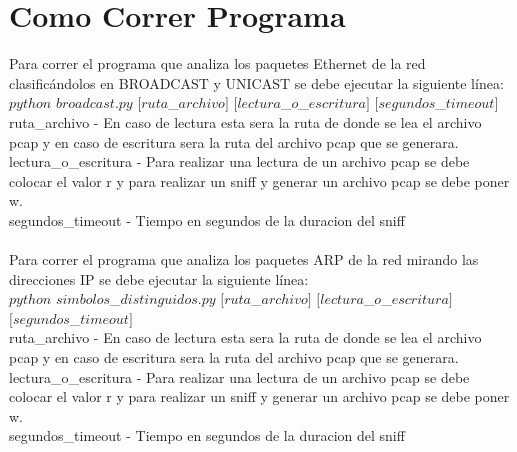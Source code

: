 \section{Como Correr Programa}

Para correr el programa que analiza los paquetes Ethernet de la red clasificándolos en BROADCAST y UNICAST se debe ejecutar la siguiente línea:\\

$python$ $broadcast.py$ $[ruta$_$archivo]$ $[lectura$_$o$_$escritura]$ $[segundos$_$timeout]$ \\

ruta_archivo - En caso de lectura esta sera la ruta de donde se lea el archivo pcap y en caso de escritura sera la ruta del archivo pcap que se generara.\\
lectura_o_escritura - Para realizar una lectura de un archivo pcap se debe colocar el valor r y para realizar un sniff y generar un archivo pcap se debe poner w.\\
segundos_timeout - Tiempo en segundos de la duracion del sniff\\
\\
Para correr el programa que analiza los paquetes ARP de la red mirando las direcciones IP se debe ejecutar la siguiente línea:\\

$python$ $simbolos$_$distinguidos.py$ $[ruta$_$archivo]$ $[lectura$_$o$_$escritura]$ $[segundos$_$timeout]$ \\

ruta_archivo - En caso de lectura esta sera la ruta de donde se lea el archivo pcap y en caso de escritura sera la ruta del archivo pcap que se generara.\\
lectura_o_escritura - Para realizar una lectura de un archivo pcap se debe colocar el valor r y para realizar un sniff y generar un archivo pcap se debe poner w.\\
segundos_timeout - Tiempo en segundos de la duracion del sniff\\
